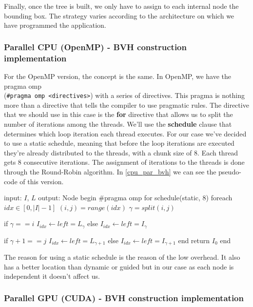 \documentclass[titlepage,12pt]{report}
\begin{document}
Finally, once the tree is built, we only have to assign to each internal node the bounding box. The strategy varies according to the architecture on which we have programmed the application.

\subsubsection{Parallel CPU (OpenMP) - BVH construction implementation}

For the OpenMP version, the concept is the same. In OpenMP, we have the pragma omp\\
(\lstinline|#pragma omp <directives>|) with a series of directives. This pragma is nothing more than a directive that tells the compiler to use pragmatic rules. The directive that we should use in this case is the \textbf{for} directive that allows us to split the number of iterations among the threads. We'll use the \textbf{schedule} clause that determines which loop iteration each thread executes. For our case we've decided to use a static schedule, meaning that before the loop iterations are executed they're already distributed to the threads, with a chunk size of 8. Each thread gets 8 consecutive iterations. The assignment of iterations to the threads is done through the Round-Robin algorithm. In \ref{cpu_par_bvh} we can see the pseudo-code of this version.

\begin{algorithm}[caption={BVH construction CPU - parallel}, label={cpu_par_bvh}]
input: $I$, $L$
output: Node
begin
  #pragma omp for schedule(static, 8)
  foreach $idx \in [0, |I|-1]$
    $(i,j) = range(idx)$
    $\gamma = split(i,j)$
    
    if $ \gamma == i $
      $I_{idx} \leftarrow left = L_{\gamma}$
    else 
      $I_{idx} \leftarrow left = I_{\gamma}$
    
    if $ \gamma+1 == j $
      $I_{idx} \leftarrow left = L_{\gamma+1}$
    else 
      $I_{idx} \leftarrow left = I_{\gamma+1}$
  end
  return $I_{0}$
end
\end{algorithm}

The reason for using a static schedule is the reason of the low overhead. It also has a better location than dynamic or guided but in our case as each node is independent it doesn't affect us.

\subsubsection{Parallel GPU (CUDA) - BVH construction implementation}
\end{document}
